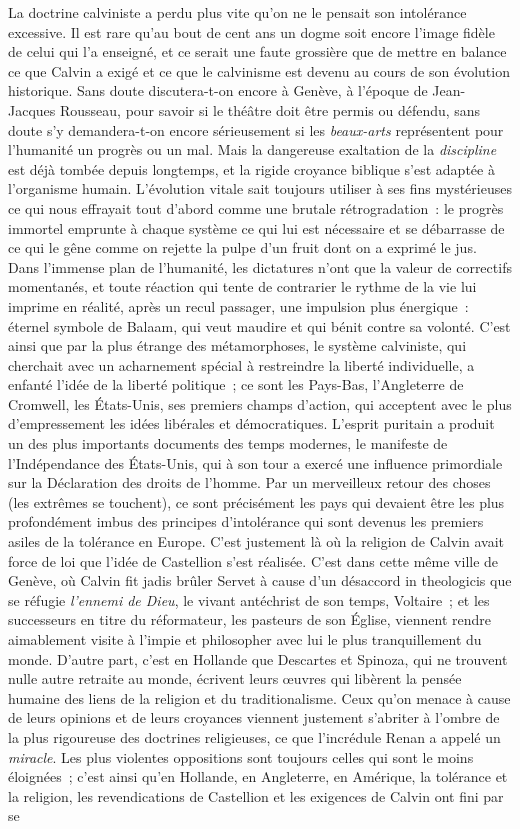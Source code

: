\documentclass[french,twoside]{book} %
\begin{document}
La doctrine calviniste a perdu plus vite qu’on ne le pensait son intolérance excessive. Il est rare qu’au bout de cent ans un dogme soit encore l’image fidèle de celui qui l’a enseigné, et ce serait une faute grossière que de mettre en balance ce que Calvin a exigé et ce que le calvinisme est devenu au cours de son évolution historique. Sans doute discutera-t-on encore à Genève, à l’époque de Jean-Jacques Rousseau, pour savoir si le théâtre doit être permis ou défendu, sans doute s’y demandera-t-on encore sérieusement si les \emph{beaux-arts} représentent pour l’humanité un progrès ou un mal. Mais la dangereuse exaltation de la \emph{discipline} est déjà tombée depuis longtemps, et la rigide croyance biblique s’est adaptée à l’organisme humain. L’évolution vitale sait toujours utiliser à ses fins mystérieuses ce qui nous effrayait tout d’abord comme une brutale rétrogradation : le progrès immortel emprunte à chaque système ce qui lui est nécessaire et se débarrasse de ce qui le gêne comme on rejette la pulpe d’un fruit dont on a exprimé le jus. Dans l’immense plan de l’humanité, les dictatures n’ont que la valeur de correctifs momentanés, et toute réaction qui tente de contrarier le rythme de la vie lui imprime en réalité, après un recul passager, une impulsion plus énergique : éternel symbole de Balaam, qui veut maudire et qui bénit contre sa volonté. C’est ainsi que par la plus étrange des métamorphoses, le système calviniste, qui cherchait avec un acharnement spécial à restreindre la liberté individuelle, a enfanté l’idée de la liberté politique ; ce sont les Pays-Bas, l’Angleterre de Cromwell, les États-Unis, ses premiers champs d’action, qui acceptent avec le plus d’empressement les idées libérales et démocratiques. L’esprit puritain a produit un des plus importants documents des temps modernes, le manifeste de l’Indépendance des États-Unis, qui à son tour a exercé une influence primordiale sur la Déclaration des droits de l’homme. Par un merveilleux retour des choses (les extrêmes se touchent), ce sont précisément les pays qui devaient être les plus profondément imbus des principes d’intolérance qui sont devenus les premiers asiles de la tolérance en Europe. C’est justement là où la religion de Calvin avait force de loi que l’idée de Castellion s’est réalisée. C’est dans cette même ville de Genève, où Calvin fit jadis brûler Servet à cause d’un désaccord in theologicis que se réfugie \emph{l’ennemi de Dieu}, le vivant antéchrist de son temps, Voltaire ; et les successeurs en titre du réformateur, les pasteurs de son Église, viennent rendre aimablement visite à l’impie et philosopher avec lui le plus tranquillement du monde. D’autre part, c’est en Hollande que Descartes et Spinoza, qui ne trouvent nulle autre retraite au monde, écrivent leurs œuvres qui libèrent la pensée humaine des liens de la religion et du traditionalisme. Ceux qu’on menace à cause de leurs opinions et de leurs croyances viennent justement s’abriter à l’ombre de la plus rigoureuse des doctrines religieuses, ce que l’incrédule Renan a appelé un \emph{miracle}. Les plus violentes oppositions sont toujours celles qui sont le moins éloignées ; c’est ainsi qu’en Hollande, en Angleterre, en Amérique, la tolérance et la religion, les revendications de Castellion et les exigences de Calvin ont fini par se 
\end{document}
